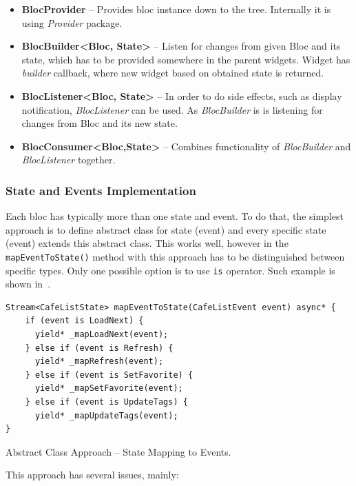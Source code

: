 \begin{itemize}
    \item \textbf{BlocProvider} -- Provides \gls{bloc} instance down to the tree. Internally it is using \textit{Provider} package.
    \item \textbf{BlocBuilder\textless Bloc, State\textgreater} -- Listen for changes from given Bloc and its state, which has to be provided somewhere in the parent widgets. Widget has \textit{builder} callback, where new widget based on obtained state is returned. 
    \item \textbf{BlocListener\textless Bloc, State\textgreater} -- In order to do side effects, such as display notification, \textit{BlocListener} can be used. As \textit{BlocBuilder} is is listening for changes from Bloc and its new state. 
    \item \textbf{BlocConsumer\textless Bloc,State\textgreater} -- Combines functionality of \textit{BlocBuilder} and \textit{BlocListener} together.
\end{itemize}

\subsubsection{State and Events Implementation}
Each \gls{bloc} has typically more than one state and event. To do that, the simplest approach is to define abstract class for state (event) and every specific state (event) extends this abstract class. This works well, however in the \verb|mapEventToState()| method with this approach has to be distinguished between specific types. Only one possible option is to use \verb|is| operator. Such example is shown in~. 

\begin{listing}[ht]
\begin{verbatim}
Stream<CafeListState> mapEventToState(CafeListEvent event) async* {
    if (event is LoadNext) {
      yield* _mapLoadNext(event);
    } else if (event is Refresh) {
      yield* _mapRefresh(event);
    } else if (event is SetFavorite) {
      yield* _mapSetFavorite(event);
    } else if (event is UpdateTags) {
      yield* _mapUpdateTags(event);
}
\end{verbatim}
\caption{Abstract Class Approach -- State Mapping to Events.}
\label{listing:ct-state-map-abstract}
\end{listing}

This approach has several issues, mainly: 

